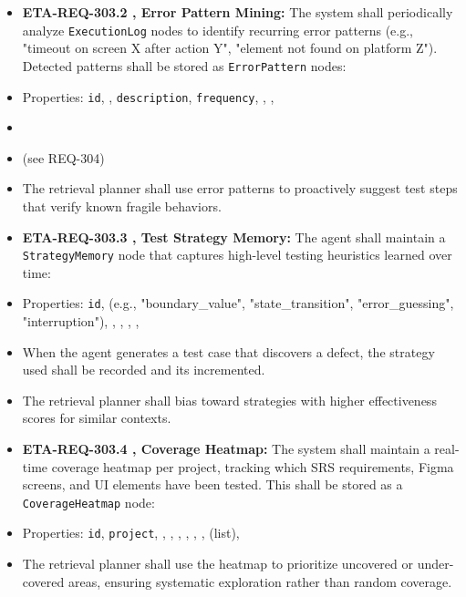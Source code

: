 \begin{itemize}[leftmargin=1.4em,itemsep=1pt,topsep=3pt]
  \item \textbf{ETA-REQ-303.2 ,  Error Pattern Mining:} The system shall periodically analyze \texttt{ExecutionLog} nodes to identify recurring error patterns (e.g., "timeout on screen X after action Y", "element not found on platform Z"). Detected patterns shall be stored as \texttt{ErrorPattern} nodes:
  \item Properties: \texttt{id}, , \texttt{description}, \texttt{frequency}, , , 
  \item {}
  \item {} (see REQ-304)
  \item The retrieval planner shall use error patterns to proactively suggest test steps that verify known fragile behaviors.
\end{itemize}

\begin{itemize}[leftmargin=1.4em,itemsep=1pt,topsep=3pt]
  \item \textbf{ETA-REQ-303.3 ,  Test Strategy Memory:} The agent shall maintain a \texttt{StrategyMemory} node that captures high-level testing heuristics learned over time:
  \item Properties: \texttt{id},  (e.g., "boundary\_value", "state\_transition", "error\_guessing", "interruption"), , , , , 
  \item When the agent generates a test case that discovers a defect, the strategy used shall be recorded and its  incremented.
  \item The retrieval planner shall bias toward strategies with higher effectiveness scores for similar contexts.
\end{itemize}

\begin{itemize}[leftmargin=1.4em,itemsep=1pt,topsep=3pt]
  \item \textbf{ETA-REQ-303.4 ,  Coverage Heatmap:} The system shall maintain a real-time coverage heatmap per project, tracking which SRS requirements, Figma screens, and UI elements have been tested. This shall be stored as a \texttt{CoverageHeatmap} node:
  \item Properties: \texttt{id}, \texttt{project}, , , , , , ,  (list), 
  \item The retrieval planner shall use the heatmap to prioritize uncovered or under-covered areas, ensuring systematic exploration rather than random coverage.
\end{itemize}

